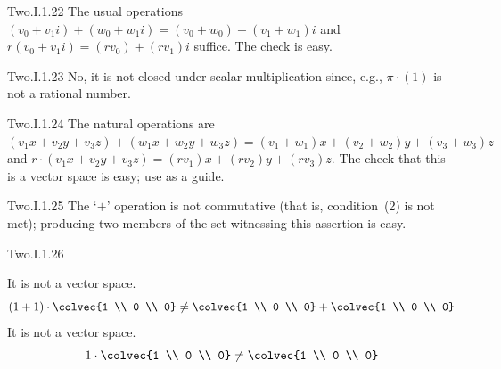 \begin{ans}{Two.I.1.22}
      The usual operations
      \( (v_0+v_1i)+(w_0+w_1i)=(v_0+w_0)+(v_1+w_1)i \) and
      \( r(v_0+v_1i)=(rv_0)+(rv_1)i \) suffice.
      The check is easy.
    
\end{ans}
\begin{ans}{Two.I.1.23}
       No, it is not closed under scalar multiplication since, e.g.,
       \( \pi\cdot (1) \) is not a rational number.
    
\end{ans}
\begin{ans}{Two.I.1.24}
      The natural operations are
      \( (v_1x+v_2y+v_3z)+(w_1x+w_2y+w_3z)=(v_1+w_1)x+(v_2+w_2)y+(v_3+w_3)z \)
      and \( r\cdot(v_1x+v_2y+v_3z)=(rv_1)x+(rv_2)y+(rv_3)z \).
      The check that this is a vector space is easy; use
       as a guide.
    
\end{ans}
\begin{ans}{Two.I.1.25}
      The `\( + \)' operation is not commutative (that is, condition~(2) is
      not met); producing two members of the
      set witnessing this assertion is easy.
    
\end{ans}
\begin{ans}{Two.I.1.26}
      \begin{exparts}
        \partsitem It is not a vector space.
          \begin{equation*}
            (1+1)\cdot\colvec{1 \\ 0 \\ 0}\neq
            \colvec{1 \\ 0 \\ 0}
            +\colvec{1 \\ 0 \\ 0}
          \end{equation*}
        \partsitem It is not a vector space.
          \begin{equation*}
            1\cdot\colvec{1 \\ 0 \\ 0}\neq\colvec{1 \\ 0 \\ 0}
          \end{equation*}
      \end{exparts}
    
\end{ans}

